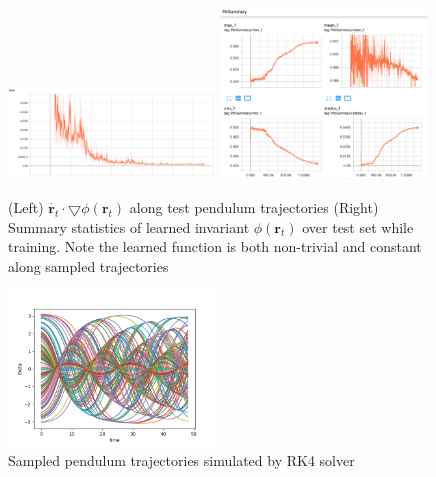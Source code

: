 \documentclass[10pt,letterpaper]{report}
\begin{document}
\begin{figure}
\begin{center}
	\includegraphics[width=0.49\textwidth]{images/pendulum_training.png}
	\includegraphics[width=0.49\textwidth]{images/Learned_phi_pendulum.png}
	\caption{\small (Left) $\dot{\pmb{r}_t} \cdot \bigtriangledown \phi \left( \pmb{r}_t \right)$ along test pendulum trajectories (Right) Summary statistics of learned invariant $\phi \left( \pmb{r}_t \right)$ over test set while training. Note the learned function is both non-trivial and constant along sampled trajectories  }
\end{center}	
\end{figure}

\begin{figure}
	\begin{center}
		\includegraphics[width=0.49\textwidth]{images/Figure_1.png}
		\caption{\small Sampled pendulum trajectories simulated by RK4 solver}
	\end{center}	
\end{figure}
\end{document}
